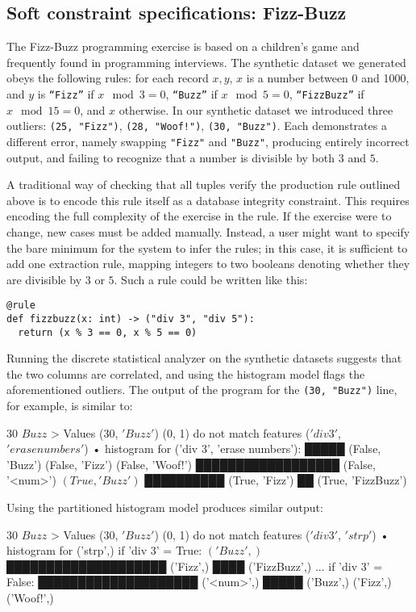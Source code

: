 \subsection{Soft constraint specifications: Fizz-Buzz}
The Fizz-Buzz programming exercise is based on a children's game and frequently found in programming interviews. The synthetic dataset we generated obeys the following rules: for each record \(x, y\), $x$ is a number between 0 and 1000, and $y$ is \texttt{``Fizz''} if \(x \mod 3 = 0\), \texttt{``Buzz''} if \(x \mod 5 = 0\), \texttt{``FizzBuzz''} if \(x \mod 15 = 0\), and \(x\) otherwise. In our synthetic dataset we introduced three outliers: \texttt{(25, "Fizz")}, \texttt{(28, "Woof!")}, \texttt{(30, "Buzz")}. Each demonstrates a different error, namely swapping \texttt{"Fizz"} and \texttt{"Buzz"}, producing entirely incorrect output, and failing to recognize that a number is divisible by both $3$ and $5$.

A traditional way of checking that all tuples verify the production rule outlined above is to encode this rule itself as a database integrity constraint. This requires encoding the full complexity of the exercise in the rule. If the exercise were to change, new cases must be added manually. Instead, a user might want to specify the bare minimum for the system to infer the rules; in this case, it is sufficient to add one extraction rule, mapping integers to two booleans denoting whether they are divisible by $3$ or $5$. Such a rule could be written like this:

\begin{verbatim}
@rule
def fizzbuzz(x: int) -> ("div 3", "div 5"):
  return (x % 3 == 0, x % 5 == 0)
\end{verbatim}

Running the discrete statistical analyzer on the synthetic datasets suggests that the two columns are correlated, and using the histogram model flags the aforementioned outliers. The output of the program for the \texttt{(30, "Buzz")} line, for example, is similar to:

\begin{lstnobreak}[gobble=2]
   $30$ $Buzz$
   > Values ($30$, $'Buzz'$) (0, 1) do not match
     features ($'div 3'$, $'erase numbers'$)
     • histogram for ('div 3', 'erase numbers'):
       █████ (False, 'Buzz')
       (False, 'Fizz')
       (False, 'Woof!')
       ██████████████████ (False, '<num>')
       $(True, 'Buzz')$
       ██████████ (True, 'Fizz')
       ██ (True, 'FizzBuzz')
\end{lstnobreak}

Using the partitioned histogram model produces similar output:

\begin{lstnobreak}[gobble=2]
   $30$ $Buzz$
   > Values ($30$, $'Buzz'$) (0, 1) do not match
     features ($'div 3'$, $'strp'$)
     • histogram for ('strp',) if 'div 3' = True:
       $('Buzz',)$
       ████████████████████ ('Fizz',)
       ████ ('FizzBuzz',)
     ... if 'div 3' = False:
       ████████████████████ ('<num>',)
       █████ ('Buzz',)
       ('Fizz',)
       ('Woof!',)
\end{lstnobreak}
